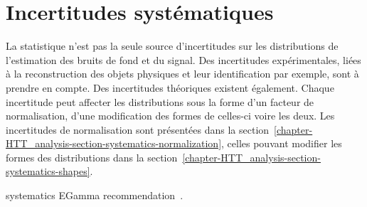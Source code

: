 \section{Incertitudes systématiques}\label{chapter-HTT_analysis-section-systematics}
La statistique n'est pas la seule source d'incertitudes sur les distributions de l'estimation des bruits de fond et du signal.
Des incertitudes expérimentales, liées à la reconstruction des objets physiques et leur identification par exemple, sont à prendre en compte.
Des incertitudes théoriques existent également.
Chaque incertitude peut affecter les distributions sous la forme d'un facteur de normalisation, d'une modification des formes de celles-ci voire les deux.
Les incertitudes de normalisation sont présentées dans la section~\ref{chapter-HTT_analysis-section-systematics-normalization},
celles pouvant modifier les formes des distributions dans la section~\ref{chapter-HTT_analysis-section-systematics-shapes}.

systematics EGamma recommendation~\cite{EGammaRunII}.


